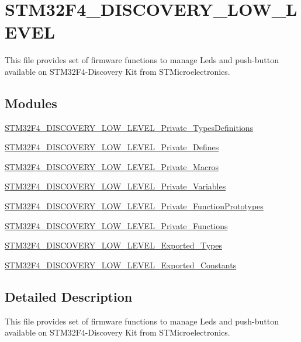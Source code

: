 \hypertarget{group___s_t_m32_f4___d_i_s_c_o_v_e_r_y___l_o_w___l_e_v_e_l}{\section{S\-T\-M32\-F4\-\_\-\-D\-I\-S\-C\-O\-V\-E\-R\-Y\-\_\-\-L\-O\-W\-\_\-\-L\-E\-V\-E\-L}
\label{group___s_t_m32_f4___d_i_s_c_o_v_e_r_y___l_o_w___l_e_v_e_l}
}


This file provides set of firmware functions to manage Leds and push-\/button available on S\-T\-M32\-F4-\/\-Discovery Kit from S\-T\-Microelectronics.  


\subsection*{Modules}
\begin{DoxyCompactItemize}
\item 
\hyperlink{group___s_t_m32_f4___d_i_s_c_o_v_e_r_y___l_o_w___l_e_v_e_l___private___types_definitions}{S\-T\-M32\-F4\-\_\-\-D\-I\-S\-C\-O\-V\-E\-R\-Y\-\_\-\-L\-O\-W\-\_\-\-L\-E\-V\-E\-L\-\_\-\-Private\-\_\-\-Types\-Definitions}
\item 
\hyperlink{group___s_t_m32_f4___d_i_s_c_o_v_e_r_y___l_o_w___l_e_v_e_l___private___defines}{S\-T\-M32\-F4\-\_\-\-D\-I\-S\-C\-O\-V\-E\-R\-Y\-\_\-\-L\-O\-W\-\_\-\-L\-E\-V\-E\-L\-\_\-\-Private\-\_\-\-Defines}
\item 
\hyperlink{group___s_t_m32_f4___d_i_s_c_o_v_e_r_y___l_o_w___l_e_v_e_l___private___macros}{S\-T\-M32\-F4\-\_\-\-D\-I\-S\-C\-O\-V\-E\-R\-Y\-\_\-\-L\-O\-W\-\_\-\-L\-E\-V\-E\-L\-\_\-\-Private\-\_\-\-Macros}
\item 
\hyperlink{group___s_t_m32_f4___d_i_s_c_o_v_e_r_y___l_o_w___l_e_v_e_l___private___variables}{S\-T\-M32\-F4\-\_\-\-D\-I\-S\-C\-O\-V\-E\-R\-Y\-\_\-\-L\-O\-W\-\_\-\-L\-E\-V\-E\-L\-\_\-\-Private\-\_\-\-Variables}
\item 
\hyperlink{group___s_t_m32_f4___d_i_s_c_o_v_e_r_y___l_o_w___l_e_v_e_l___private___function_prototypes}{S\-T\-M32\-F4\-\_\-\-D\-I\-S\-C\-O\-V\-E\-R\-Y\-\_\-\-L\-O\-W\-\_\-\-L\-E\-V\-E\-L\-\_\-\-Private\-\_\-\-Function\-Prototypes}
\item 
\hyperlink{group___s_t_m32_f4___d_i_s_c_o_v_e_r_y___l_o_w___l_e_v_e_l___private___functions}{S\-T\-M32\-F4\-\_\-\-D\-I\-S\-C\-O\-V\-E\-R\-Y\-\_\-\-L\-O\-W\-\_\-\-L\-E\-V\-E\-L\-\_\-\-Private\-\_\-\-Functions}
\item 
\hyperlink{group___s_t_m32_f4___d_i_s_c_o_v_e_r_y___l_o_w___l_e_v_e_l___exported___types}{S\-T\-M32\-F4\-\_\-\-D\-I\-S\-C\-O\-V\-E\-R\-Y\-\_\-\-L\-O\-W\-\_\-\-L\-E\-V\-E\-L\-\_\-\-Exported\-\_\-\-Types}
\item 
\hyperlink{group___s_t_m32_f4___d_i_s_c_o_v_e_r_y___l_o_w___l_e_v_e_l___exported___constants}{S\-T\-M32\-F4\-\_\-\-D\-I\-S\-C\-O\-V\-E\-R\-Y\-\_\-\-L\-O\-W\-\_\-\-L\-E\-V\-E\-L\-\_\-\-Exported\-\_\-\-Constants}
\end{DoxyCompactItemize}


\subsection{Detailed Description}
This file provides set of firmware functions to manage Leds and push-\/button available on S\-T\-M32\-F4-\/\-Discovery Kit from S\-T\-Microelectronics. 